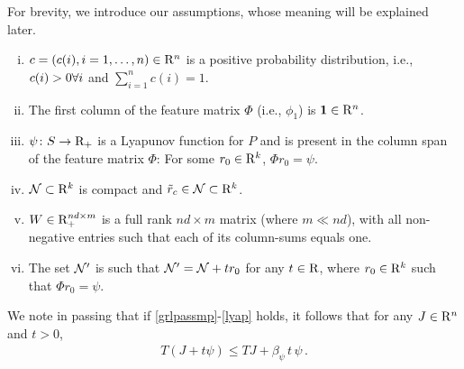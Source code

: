 For brevity, we introduce our assumptions, whose meaning will be explained later.
\begin{assumption}\label{grlpassmp}
\begin{enumerate}[(i)]
\item \label{probdist} $c=(c(i),i=1,\ldots,n)\in \mathrm{R}^n$ is a positive probability distribution, i.e., $c(i)>0 \relax{ } \forall i$ and $\sum_{i=1}^n c(i)=1$.
\item  \label{one} The first column of the feature matrix $\Phi$ (i.e., $\phi_1$) is $\mathbf{1} \in \mathrm{R}^n$. 
\item \label{lyap} $\psi\colon S \rightarrow \mathrm{R}_+$ is a Lyapunov function for $P$
and is present in the column span of the feature matrix $\Phi$: For some $r_0\in \mathrm{R}^k$, $\Phi r_0 = \psi$. 
\item \label{nassmp} $\mathcal{N}\subset \mathrm{R}^k$ is compact and $\tilde{r}_c \in \mathcal{N}\subset\mathrm{R}^k$.
\item \label{wassump} $W \in \mathrm{R}^{nd\times m}_+$ is a full rank $nd\times m$ matrix (where $m\ll nd$), with all non-negative entries such that each of its column-sums equals one.
\item \label{ass:n4} The set $\mathcal{N}'$ is such that $\mathcal{N}' = \mathcal{N} + t r_0$ for any $t\in \mathrm{R}$, where $r_0\in \mathrm{R}^k$ such that $\Phi r_0 = \psi$.
\end{enumerate}
\end{assumption}
We note in passing that if \cref{grlpassmp}-\eqref{lyap} holds, it follows that for any $J\in \mathrm{R}^n$ and $t>0$,
\begin{align}
\label{eq:psilin}
T(J+ t \psi ) \le TJ + \beta_{\psi}\,t\,  \psi\,. %
\end{align}

